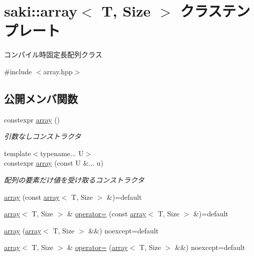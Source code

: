 \hypertarget{classsaki_1_1array}{}\section{saki\+:\+:array$<$ T, Size $>$ クラステンプレート}
\label{classsaki_1_1array}


コンパイル時固定長配列クラス  




{\ttfamily \#include $<$array.\+hpp$>$}

\subsection*{公開メンバ関数}
\begin{DoxyCompactItemize}
\item 
constexpr \mbox{\hyperlink{classsaki_1_1array_a7da734ab08c73225f9358fa6e0294025}{array}} ()
\begin{DoxyCompactList}\small\item\em 引数なしコンストラクタ \end{DoxyCompactList}\item 
{\footnotesize template$<$typename... U$>$ }\\constexpr \mbox{\hyperlink{classsaki_1_1array_a6af2c7db82438d7d56ef7c9e3d1f0cf5}{array}} (const U \&... u)
\begin{DoxyCompactList}\small\item\em 配列の要素だけ値を受け取るコンストラクタ \end{DoxyCompactList}\item 
\mbox{\hyperlink{classsaki_1_1array_a788262c2c0f097b6e8f1a9fbd6bf0034}{array}} (const \mbox{\hyperlink{classsaki_1_1array}{array}}$<$ T, Size $>$ \&)=default
\item 
\mbox{\hyperlink{classsaki_1_1array}{array}}$<$ T, Size $>$ \& \mbox{\hyperlink{classsaki_1_1array_aceb21e707471ccfc269c26138673e6ba}{operator=}} (const \mbox{\hyperlink{classsaki_1_1array}{array}}$<$ T, Size $>$ \&)=default
\item 
\mbox{\hyperlink{classsaki_1_1array_a94b434b999e60647e03a8f3920f66a6d}{array}} (\mbox{\hyperlink{classsaki_1_1array}{array}}$<$ T, Size $>$ \&\&) noexcept=default
\item 
\mbox{\hyperlink{classsaki_1_1array}{array}}$<$ T, Size $>$ \& \mbox{\hyperlink{classsaki_1_1array_a437960c16333970285d7a66e34ca6923}{operator=}} (\mbox{\hyperlink{classsaki_1_1array}{array}}$<$ T, Size $>$ \&\&) noexcept=default

\end{DoxyCompactItemize}
